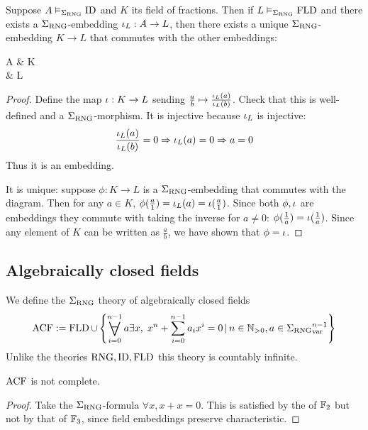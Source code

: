 \begin{prop}
    Suppose $A \vDash_{\Sigma_{\mathrm{RNG}}} \operatorname{ID}$ and $K$ its field of fractions.
    Then if $L \vDash_{\Sigma_{\mathrm{RNG}}} \operatorname{FLD}$ and there exists a
    $\Sigma_{\mathrm{RNG}}$-embedding $\iota_L : A \to L$, 
    then there exists a unique $\Sigma_{\mathrm{RNG}}$-embedding $K \to L$
    that commutes with the other embeddings:
    \begin{cd}
        A \ar[r] \ar[dr] & K \ar[d, dashed]\\
        & L
    \end{cd}
\end{prop}
\begin{proof}
    Define the map $\iota : K \to L$ sending 
    $\frac{a}{b} \mapsto \frac{\iota_L (a)}{\iota_L(b)}$.
    Check that this is well-defined and a $\Sigma_{\mathrm{RNG}}$-morphism.
    It is injective because $\iota_L$ is injective:
    \[\frac{\iota_L(a)}{\iota_L(b)} = 0 \Rightarrow \iota_L(a) = 0
    \Rightarrow a = 0\]
    Thus it is an embedding.

    It is unique: suppose $\phi : K \to L$ is a $\Sigma_{\mathrm{RNG}}$-embedding
    that commutes with the diagram.
    Then for any $a \in K$, 
    $\phi(\frac{a}{1}) = \iota_L(a) = \iota (\frac{a}{1})$.
    Since both $\phi, \iota$ are embeddings
    they commute with taking the inverse for $a \ne 0$:
    $\phi(\frac{1}{a}) = \iota (\frac{1}{a})$.
    Since any element of $K$ can be written as $\frac{a}{b}$,
    we have shown that $\phi = \iota$.
\end{proof}

\subsection{Algebraically closed fields}
\begin{dfn}
    We define the $\Sigma_{\mathrm{RNG}}$ theory of algebraically closed fields
    \[
        \ACF := 
        \FLD \cup \set{\bigforall{i = 0}{n - 1} a \exists x, \;
        x^n + \sum_{i = 0}^{n-1} a_i x^i = 0
        \st n \in \N_{>0}, a \in {\var{\Si_\RNG}^{n-1}}}
        \]
    Unlike the theories $\mathrm{RNG},\operatorname{ID},\operatorname{FLD}$ 
    this theory is countably infinite.
\end{dfn}

\begin{prop}
    $\operatorname{ACF}$ is not complete.
\end{prop}
\begin{proof}
    Take the $\Sigma_{\mathrm{RNG}}$-formula $\forall x, x + x = 0$.
    This is satisfied by the 
    of $\mathbb{F}_2$ but not by that of $\mathbb{F}_3$,
    since field embeddings preserve characteristic. 
\end{proof}

